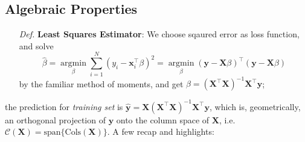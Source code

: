 \documentclass[a4paper, 11pt]{article}
\DeclareMathOperator*{\argmin}{argmin}
\begin{document}
\subsection{Algebraic Properties}
\begin{itemize}
	\item[\textit{Def.}] \textbf{Least Squares Estimator}: We choose sqaured error as loss function, and solve
	$$
	\hat{\beta} = \argmin\limits_{\beta} \sum_{i=1}^N (y_i - \bm{x}_i^{\top}\beta)^2 = \argmin\limits_{\beta} (\bm{y}-\bm{X}\beta)^{\top}(\bm{y}-\bm{X}\beta)
	$$
	by the familiar method of moments, and get $\hat{\beta} = (\bm{X}^{\top} \bm{X})^{-1}\bm{X}^{\top} \bm{y}$;
	~\\
\end{itemize}
the prediction for \emph{training set} is $\hat{\bm{y}}=\bm{X}(\bm{X}^{\top} \bm{X})^{-1}\bm{X}^{\top} \bm{y}$, which is, geometrically, an orthogonal projection of $\bm{y}$ onto the column space of $\bm{X}$, i.e. $\mathcal{C}(\bm{X})=\text{span}\{\text{Cols}(\bm{X})\}$. A few recap and highlights: 
\end{document}
